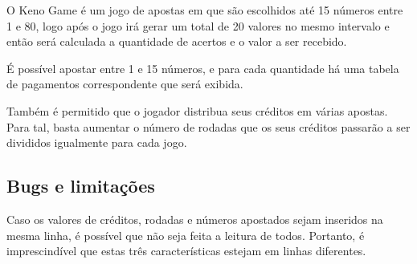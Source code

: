 O Keno Game é um jogo de apostas em que são escolhidos até 15 números entre 1 e 80, logo após o jogo irá gerar um total de 20 valores no mesmo intervalo e então será calculada a quantidade de acertos e o valor a ser recebido.

É possível apostar entre 1 e 15 números, e para cada quantidade há uma tabela de pagamentos correspondente que será exibida.

Também é permitido que o jogador distribua seus créditos em várias apostas. Para tal, basta aumentar o número de rodadas que os seus créditos passarão a ser divididos igualmente para cada jogo.

\subsection*{Bugs e limitações }

Caso os valores de créditos, rodadas e números apostados sejam inseridos na mesma linha, é possível que não seja feita a leitura de todos. Portanto, é imprescindível que estas três características estejam em linhas diferentes. 